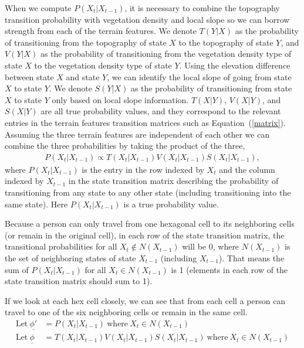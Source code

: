 When we compute $P(X_t|X_{t-1})$, it is necessary to combine the topography transition probability with vegetation density and local slope so we can borrow strength from each of the terrain features. We denote $T(Y|X)$ as the probability of transitioning from the topography of state $X$ to the topography of state $Y$, and $V(Y|X)$ as the probability of transitioning from the vegetation density type of state $X$ to the vegetation density type of state $Y$. Using the elevation difference between state $X$ and state $Y$, we can identify the local slope of going from state $X$ to state $Y$. We denote $S(Y|X)$ as the probability of transitioning from state $X$ to state $Y$ only based on local slope information. $T(X|Y)$, $V(X|Y)$, and $S(X|Y)$ are all true probability values, and they correspond to the relevant entries in the terrain features transition matrices such as Equation~(\ref{matrix}). Assuming the three terrain features are independent of each other we can combine the three probabilities by taking the product of the three,
\begin{align}
\label{product}
P(X_t|X_{t-1}) \propto T(X_t|X_{t-1})V(X_t|X_{t-1})S(X_t|X_{t-1}),
\end{align}
where $P(X_t|X_{t-1})$ is the entry in the row indexed by $X_t$ and the column indexed by $X_{t-1}$ in the state transition matrix describing the probability of transitioning from any state to any other state (including transitioning into the same state). Here $P(X_t|X_{t-1})$ is a true probability value.

Because a person can only travel from one hexagonal cell to its neighboring cells (or remain in the original cell), in each row of the state transition matrix, the transitional probabilities for all $X_t \notin N(X_{t-1})$ will be 0, where $N(X_{t-1})$ is the set of neighboring states of state $X_{t-1}$ (including $X_{t-1}$). That means the sum of $P(X_t|X_{t-1})$ for all $X_t \in N(X_{t-1})$ is 1 (elements in each row of the state transition matrix should sum to 1). 

If we look at each hex cell closely, we can see that from each cell a person can travel to one of the six neighboring cells or remain in the same cell. 
\begin{align}
\label{sub}
\mathrm{Let}~\underline{\phi'} &= P(X_t|X_{t-1}) ~\mathrm{where}~ X_t \in N(X_{t-1})\\
\mathrm{Let}~\underline{\phi} &= T(X_t|X_{t-1})V(X_t|X_{t-1})S(X_t|X_{t-1}) ~\mathrm{where}~ X_t \in N(X_{t-1})
\end{align}

